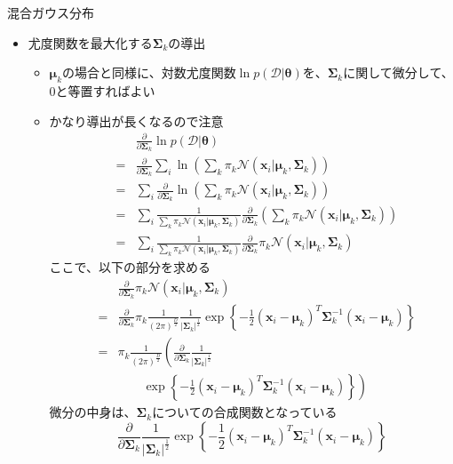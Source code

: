 \documentclass[dvipdfmx,notheorems,t]{beamer}
\begin{document}
\begin{frame}{混合ガウス分布}

\begin{itemize}
	\item 尤度関数を最大化する$\bm{\Sigma}_k$の導出
	\begin{itemize}
		\item $\bm{\mu}_k$の場合と同様に、対数尤度関数$\ln p(\mathcal{D} | \bm{\theta})$を、$\bm{\Sigma}_k$に関して微分して、$0$と等置すればよい
		\item \alert{かなり導出が長くなるので注意}
		\begin{eqnarray}
			&& \frac{\partial}{\partial \bm{\Sigma}_k} \ln p(\mathcal{D} | \bm{\theta}) \nonumber \\
			&=& \frac{\partial}{\partial \bm{\Sigma}_k} \sum_i \ln \left( \sum_k \pi_k \mathcal{N}(\bm{x}_i | \bm{\mu}_k, \bm{\Sigma}_k) \right) \nonumber \\
			&=& \sum_i \frac{\partial}{\partial \bm{\Sigma}_k} \ln \left( \sum_k \pi_k \mathcal{N}(\bm{x}_i | \bm{\mu}_k, \bm{\Sigma}_k) \right) \nonumber \\
			&=& \sum_i \frac{1}{\sum_k \pi_k \mathcal{N}(\bm{x}_i | \bm{\mu}_k, \bm{\Sigma}_k)} \frac{\partial}{\partial \bm{\Sigma}_k} \left( \sum_k \pi_k \mathcal{N}(\bm{x}_i | \bm{\mu}_k, \bm{\Sigma}_k) \right) \nonumber \\
			&=& \sum_i \frac{1}{\sum_k \pi_k \mathcal{N}(\bm{x}_i | \bm{\mu}_k, \bm{\Sigma}_k)} \frac{\partial}{\partial \bm{\Sigma}_k} \pi_k \mathcal{N}(\bm{x}_i | \bm{\mu}_k, \bm{\Sigma}_k)
		\end{eqnarray}
		ここで、以下の部分を求める
		\begin{eqnarray}
			&& \frac{\partial}{\partial \bm{\Sigma}_k} \pi_k \mathcal{N}(\bm{x}_i | \bm{\mu}_k, \bm{\Sigma}_k) \nonumber \\
			&=& \frac{\partial}{\partial \bm{\Sigma}_k} \pi_k \frac{1}{(2\pi)^\frac{D}{2}} \frac{1}{|\bm{\Sigma}_k|^\frac{1}{2}} \exp \left\{ - \frac{1}{2} (\bm{x}_i - \bm{\mu}_k)^T \bm{\Sigma}_k^{-1} (\bm{x}_i - \bm{\mu}_k) \right\} \nonumber \\
			&=& \pi_k \frac{1}{(2\pi)^\frac{D}{2}} \left( \frac{\partial}{\partial \bm{\Sigma}_k} \frac{1}{|\bm{\Sigma}_k|^\frac{1}{2}} \right. \nonumber \\
			&& \qquad \left. \exp \left\{ - \frac{1}{2} (\bm{x}_i - \bm{\mu}_k)^T \bm{\Sigma}_k^{-1} (\bm{x}_i - \bm{\mu}_k) \right\} \right)
		\end{eqnarray}
		微分の中身は、$\bm{\Sigma}_k$についての合成関数となっている
		\begin{equation}
			\frac{\partial}{\partial \bm{\Sigma}_k} \frac{1}{|\bm{\Sigma}_k|^\frac{1}{2}} \exp \left\{ - \frac{1}{2} (\bm{x}_i - \bm{\mu}_k)^T \bm{\Sigma}_k^{-1} (\bm{x}_i - \bm{\mu}_k) \right\} \nonumber
		\end{equation}
		\newline
		

\end{itemize}
\end{itemize}
\end{frame}
\end{document}
